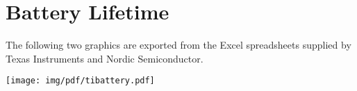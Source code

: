 \section{Battery Lifetime} %
\label{sec:battery_life_appendix}

The following two graphics are exported from the Excel spreadsheets supplied by Texas Instruments and Nordic Semiconductor.

\texttt{[image: img/pdf/tibattery.pdf]}


